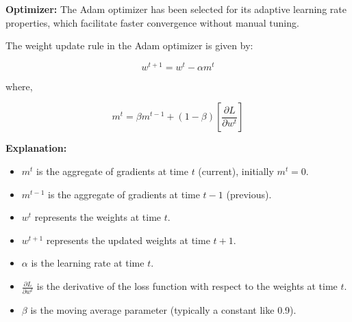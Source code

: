 \textbf{Optimizer:}
The Adam optimizer has been selected for its adaptive learning rate properties, which facilitate faster convergence without manual tuning.

The weight update rule in the Adam optimizer is given by:

\[
w^{t+1} = w^{t} - \alpha m^{t}
\]

where,

\[
m^{t} = \beta m^{t-1} + (1-\beta) \left[ \frac{\partial L}{\partial w^{t}} \right]
\]

\textbf{Explanation:}

\begin{itemize}
    \item \( m^{t} \) is the aggregate of gradients at time \( t \) (current), initially \( m^{t} = 0 \).
    \item \( m^{t-1} \) is the aggregate of gradients at time \( t-1 \) (previous).
    \item \( w^{t} \) represents the weights at time \( t \).
    \item \( w^{t+1} \) represents the updated weights at time \( t+1 \).
    \item \( \alpha \) is the learning rate at time \( t \).
    \item \( \frac{\partial L}{\partial w^{t}} \) is the derivative of the loss function with respect to the weights at time \( t \).
    \item \( \beta \) is the moving average parameter (typically a constant like 0.9).
\end{itemize}









